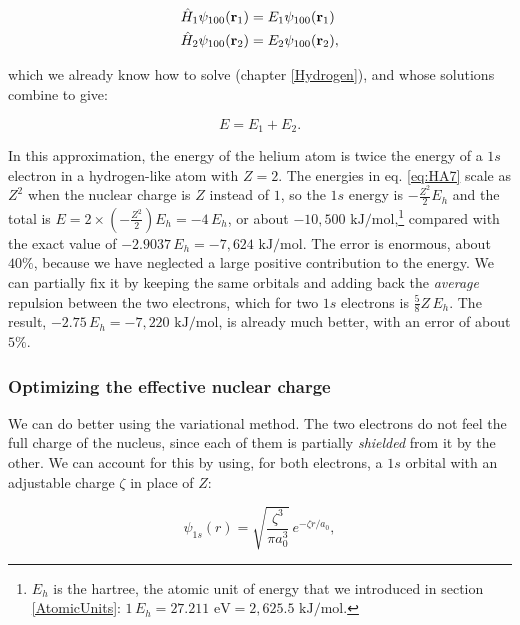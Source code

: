 \documentclass[
  english,
  9pt,
]{extbook}
\theoremstyle{definition}
\theoremstyle{definition}
\theoremstyle{definition}
\theoremstyle{definition}
\theoremstyle{remark}
\begin{document}
\begin{equation}
\begin{aligned}
\hat{H}_1 \psi_{100}({\bf r}_1) &= E_1\psi_{100}({\bf r}_1) \\
\hat{H}_2 \psi_{100}({\bf r}_2) &= E_2\psi_{100}({\bf r}_2),
\end{aligned}
\label{eq:hf4}
\end{equation}

which we already know how to solve (chapter \ref{Hydrogen}), and whose solutions combine to give:

\begin{equation}
E = E_1+E_2.
\label{eq:hf5}
\end{equation}

In this approximation, the energy of the helium atom is twice the energy of a \(1s\) electron in a hydrogen-like atom with \(Z=2\). The energies in eq. \eqref{eq:HA7} scale as \(Z^2\) when the nuclear charge is \(Z\) instead of \(1\), so the \(1s\) energy is \(-\frac{Z^2}{2}E_h\) and the total is \(E=2\times\left(-\frac{Z^2}{2}\right)E_h=-4\,E_h\), or about \(-10{,}500 \text{ kJ/mol}\),\footnote{\(E_h\) is the hartree, the atomic unit of energy that we introduced in section \ref{AtomicUnits}: \(1\,E_h = 27.211\text{ eV} = 2{,}625.5 \text{ kJ/mol}\).} compared with the exact value of \(-2.9037\,E_h=-7{,}624 \text{ kJ/mol}\). The error is enormous, about \(40\%\), because we have neglected a large positive contribution to the energy. We can partially fix it by keeping the same orbitals and adding back the \emph{average} repulsion between the two electrons, which for two \(1s\) electrons is \(\frac{5}{8}Z\,E_h\). The result, \(-2.75\,E_h = -7{,}220 \text{ kJ/mol}\), is already much better, with an error of about \(5\%\).

\subsubsection*{Optimizing the effective nuclear charge}\label{optimizing-the-effective-nuclear-charge}

We can do better using the variational method. The two electrons do not feel the full charge of the nucleus, since each of them is partially \emph{shielded} from it by the other. We can account for this by using, for both electrons, a \(1s\) orbital with an adjustable charge \(\zeta\) in place of \(Z\):

\begin{equation}
\psi_{1s}(r) = \sqrt{\frac{\zeta^3}{\pi a_0^3}}\, e^{-\zeta r/a_0},
\label{eq:hevar1}
\end{equation}
\end{document}
